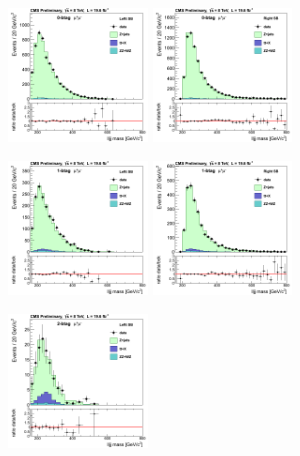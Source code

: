 \begin{figure}[htb]
\centerline{
\includegraphics[width=0.33\textwidth]{plots/approvalxchecks/Left_0b_mmlin.png}
\includegraphics[width=0.33\textwidth]{plots/approvalxchecks/Right_0b_mmlin.png}
}
\centerline{
\includegraphics[width=0.33\textwidth]{plots/approvalxchecks/Left_1b_mmlin.png}
\includegraphics[width=0.33\textwidth]{plots/approvalxchecks/Right_1b_mmlin.png}
}
\centerline{
\includegraphics[width=0.33\textwidth]{plots/approvalxchecks/Left_2b_mmlin.png}
}
\end{figure}
